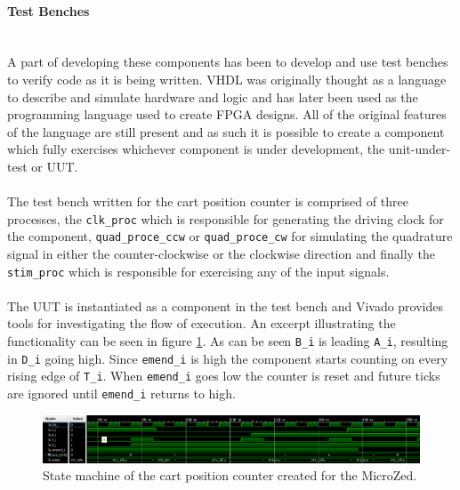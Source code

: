 \paragraph{Test Benches}~\\ %
\label{par:test_benches}
A part of developing these components has been to develop and use test benches to verify code as it is being written.
VHDL was originally thought as a language to describe and simulate hardware and logic and has later been used as the programming language used to create FPGA designs.
All of the original features of the language are still present and as such it is possible to create a component which fully exercises whichever component is under development, the unit-under-test or UUT.
\\~\\
The test bench written for the cart position counter is comprised of three processes, the \texttt{clk\_proc} which is responsible for generating the driving clock for the component, \texttt{quad\_proce\_ccw} or \texttt{quad\_proce\_cw} for simulating the quadrature signal in either the counter-clockwise or the clockwise direction and finally the \texttt{stim\_proc} which is responsible for exercising any of the input signals.
\\~\\
The UUT is instantiated as a component in the test bench and Vivado provides tools for investigating the flow of execution.
An excerpt illustrating the functionality can be seen in figure \ref{fig:testbench}.
As can be seen \texttt{B\_i} is leading \texttt{A\_i}, resulting in \texttt{D\_i} going high.
Since \texttt{emend\_i} is high the component starts counting on every rising edge of \texttt{T\_i}.
When \texttt{emend\_i} goes low the counter is reset and future ticks are ignored until \texttt{emend\_i} returns to high.

\begin{figure}[h]
	\centering
	\includegraphics[width=\linewidth]{graphics/test_bench_narrow}
	\caption{State machine of the cart position counter created for the MicroZed.}
	\label{fig:testbench}
\end{figure}

